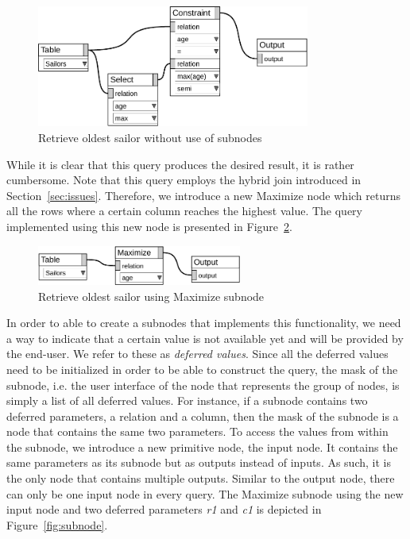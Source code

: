 \documentclass[11pt,a4paper]{globis-book}
\begin{document}
\begin{figure}[h]
  \centering
  \includegraphics[width=0.8\textwidth]{resources/MaxQ.pdf}
  \caption{Retrieve oldest sailor without use of subnodes}
  \label{fig:maxQ}
\end{figure}

While it is clear that this query produces the desired result, it is rather cumbersome. Note that this query employs the hybrid join introduced in Section~\ref{sec:issues}. Therefore, we introduce a new Maximize node which returns all the rows where a certain column reaches the highest value. The query implemented using this new node is presented in Figure~\ref{fig:maxQ_sub}.

\begin{figure}[h]
  \centering
  \includegraphics[width=0.6\textwidth]{resources/MaxQSub.pdf}
  \caption{Retrieve oldest sailor using Maximize subnode}
  \label{fig:maxQ_sub}
\end{figure}

In order to able to create a subnodes that implements this functionality, we need a way to indicate that a certain value is not available yet and will be provided by the end-user. We refer to these as \emph{deferred values}. Since all the deferred values need to be initialized in order to be able to construct the query, the mask of the subnode, i.e. the user interface of the node that represents the group of nodes, is simply a list of all deferred values. For instance, if a subnode contains two deferred parameters, a relation and a column, then the mask of the subnode is a node that contains the same two parameters. To access the values from within the subnode, we introduce a new primitive node, the input node. It contains the same parameters as its subnode but as outputs instead of inputs. As such, it is the only node that contains multiple outputs. Similar to the output node, there can only be one input node in every query. The Maximize subnode using the new input node and two deferred parameters \emph{r1} and \emph{c1} is depicted in Figure~\ref{fig:subnode}.
\end{document}
